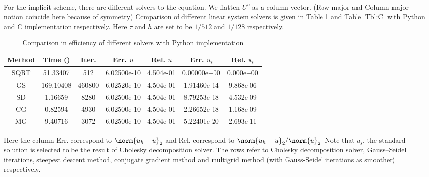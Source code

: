 \documentclass[english, nochinese]{pkupaper}
\begin{document}
\begin{thmquestion}
\ 
\begin{thmanswer}
For the implicit scheme, there are different solvers to the equation. We flatten $U^n$ as a column vector. (Row major and Column major notion coincide here because of symmetry) Comparison of different linear system solvers is given in Table \ref{Tbl:Python} and Table \ref{Tbl:C} with Python and C implementation respectively. Here $\tau$ and $h$ are set to be $ 1 / 512 $ and $ 1 / 128 $ respectively.

\begin{table}[htbp]
\centering
\caption{Comparison in efficiency of different solvers with Python implementation}
\label{Tbl:Python}
\begin{tabular}{|c|c|c|c|c|c|c|}
\hline
Method & Time (\Si{s}) & Iter. & Err. $u$ & Rel. $u$ & Err. $u_{\text{s}}$ & Rel. $u_{\text{s}}$ \\
\hline
SQRT & 51.33407 & 512 & 6.02500e-10 & 4.504e-01 & 0.00000e+00 & 0.000e+00 \\
\hline
GS & 169.10408 & 460800 & 6.02520e-10 & 4.504e-01 & 1.91460e-14 & 9.868e-06 \\
\hline
SD & 1.16659 & 8280 & 6.02500e-10 & 4.504e-01 & 8.79253e-18 & 4.532e-09 \\
\hline
CG & 0.82594 & 4930 & 6.02500e-10 & 4.504e-01 & 2.26652e-18 & 1.168e-09 \\
\hline
MG & 9.40716 & 3072 & 6.02500e-10 & 4.504e-01 & 5.22401e-20 & 2.693e-11 \\
\hline
\end{tabular}
\vskip 6pt
\raggedright
\footnotesize
Here the column Err. correspond to $ \norm{ u_h - u }_2 $ and Rel. correspond to $ \norm{ u_h - u }_2 / \norm{u}_2 $. Note that $u_{\text{s}}$, the standard solution is selected to be the result of Cholesky decomposition solver. The rows refer to Cholesky decomposition solver, Gauss--Seidel iterations, steepest descent method, conjugate gradient method and multigrid method (with Gauss-Seidel iterations as smoother) respectively.
\end{table}


\end{thmanswer}
\end{thmquestion}
\end{document}
